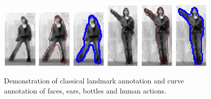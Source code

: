 \begin{figure}[ht]
    \\
    \includegraphics[width=0.15\textwidth]{resources/Annotation_Correction/Fig_Intro/intro_3_0}
    \hfill
    \includegraphics[width=0.15\textwidth]{resources/Annotation_Correction/Fig_Intro/intro_3_1}
    \hfill
    \includegraphics[width=0.15\textwidth]{resources/Annotation_Correction/Fig_Intro/intro_3_2}
    \hfill
    \includegraphics[width=0.15\textwidth]{resources/Annotation_Correction/Fig_Intro/intro_3_3}
    \hfill
    \includegraphics[width=0.15\textwidth]{resources/Annotation_Correction/Fig_Intro/intro_3_4}
    \hfill
    \includegraphics[width=0.15\textwidth]{resources/Annotation_Correction/Fig_Intro/intro_3_5}
    \caption{Demonstration of classical landmark annotation and curve annotation of faces, ears, bottles and human actions.}
    \label{fig:intro}
\end{figure}

